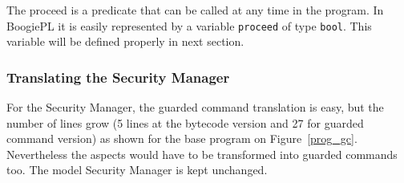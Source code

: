 The proceed is a predicate that can be called at any time in the program.
In BoogiePL it is easily represented by a variable {\tt proceed} 
of type {\tt bool}. This variable will be defined properly in next section.

\subsubsection{Translating the Security Manager}
For the Security Manager, the guarded command translation is easy, but
the number of lines grow (5 lines at the bytecode version and 27 for
guarded command version) as shown for the base program on Figure~\ref{prog_gc}.
Nevertheless the aspects would have to be transformed into guarded
commands too. The model Security Manager is kept unchanged.





